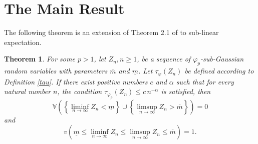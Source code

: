 \documentclass[12pt]{article}
\newtheorem{theorem}{Theorem}[section]
\theoremstyle{definition}
\theoremstyle{remark}
\numberwithin{equation}{section}
\def\Vh{{\hat{\mathbb{V}}}}
\begin{document}
\section{The Main Result} \label{main}

The following theorem is an extension of Theorem 2.1 of \cite{Zajkowski2021} 
to sub-linear expectation.
\begin{theorem} \label{MainTheorem}
For some $p>1$, let $Z_n, n\ge1$, be a sequence of  $\varphi_p$-sub-Gaussian random variables with parameters
$\overline{m}$ and $\underline{m}$.
Let $\tau_\varphi(Z_n)$ be defined according to Definition \ref{tau}.
If there exist positive numbers $c$ and $\alpha$ such that for every natural number $n$, 
the condition $\tau_{\varphi_p}\!( Z_n )\le c\, n^{-\alpha}$ is satisfied, then
\begin{equation}
\label{upper}
\Vh\left(
\left\{\liminf_{n\to\infty}{Z_n} < \underline{m}\right\}
\cup
\left\{\limsup_{n\to\infty}{Z_n} > \overline{m}\right\}
\right)
= 0
\end{equation}
and 
\begin{equation}
\label{lower}
v\left(
\underline{m}
\le \liminf_{n\to\infty}{Z_n}
\le \limsup_{n\to\infty}{Z_n}
\le \overline{m}
\right)
= 1.
\end{equation}
\end{theorem}
\end{document}
